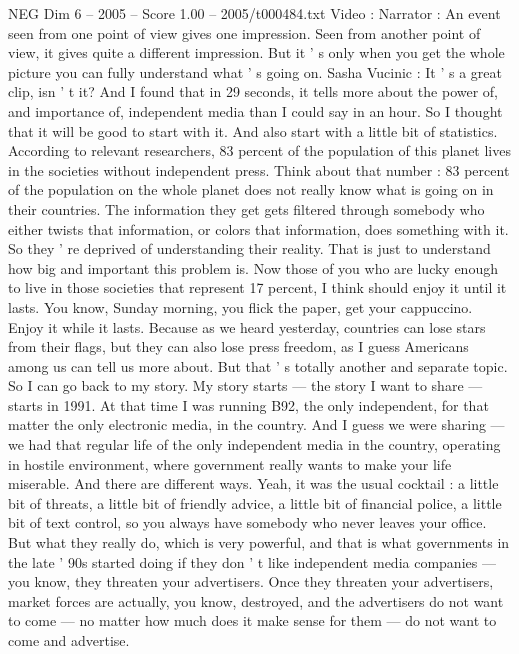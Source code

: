 \begin{textsample}{NEG Dim 6 – 2005 – Score 1.00 – 2005/t000484.txt}  \label{ex:f6_neg_075}
Video : Narrator : An event seen from one point of view gives one impression.
Seen from another point of view, it gives quite a different impression.
But it ' s only when you get the whole picture you can fully understand what ' s going on.
Sasha Vucinic : It ' s a great clip, isn ' t it?
And I found that in 29 seconds, it tells more about the power of, and importance of, independent media than I could say in an hour.
So I thought that it will be good to start with it.
And also start with a little bit of statistics.
According to relevant researchers, 83 percent of the population of this planet lives in the societies without independent press.
Think about that number : 83 percent of the population on the whole planet does not really know what is going on in their countries.
The information they get gets filtered through somebody who either twists that information, or colors that information, does something with it.
So they ' re deprived of understanding their reality.
That is just to understand how big and important this problem is.
Now those of you who are lucky enough to live in those societies that represent 17 percent, I think should enjoy it until it lasts.
You know, Sunday morning, you flick the paper, get your cappuccino.
Enjoy it while it lasts.
Because as we heard yesterday, countries can lose stars from their flags, but they can also lose press freedom, as I guess Americans among us can tell us more about.
But that ' s totally another and separate topic.
So I can go back to my story.
My story starts — the story I want to share — starts in 1991.
At that time I was running B92, the only independent, for that matter the only electronic media, in the country.
And I guess we were sharing — we had that regular life of the only independent media in the country, operating in hostile environment, where government really wants to make your life miserable.
And there are different ways.
Yeah, it was the usual cocktail : a little bit of threats, a little bit of friendly advice, a little bit of financial police, a little bit of text control, so you always have somebody who never leaves your office.
But what they really do, which is very powerful, and that is what governments in the late ' 90s started doing if they don ' t like independent media companies — you know, they threaten your advertisers.
Once they threaten your advertisers, market forces are actually, you know, destroyed, and the advertisers do not want to come — no matter how much does it make sense for them — do not want to come and advertise.

\end{textsample}
